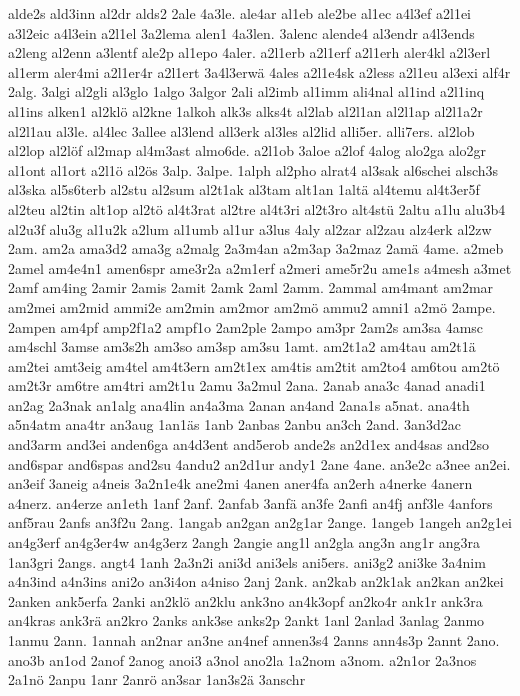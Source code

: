 {alde2s
ald3inn
al2dr
alds2
2ale
4a3le.
ale4ar
al1eb
ale2be
al1ec
a4l3ef
a2l1ei
a3l2eic
a4l3ein
a2l1el
3a2lema
alen1
4a3len.
3alenc
alende4
al3endr
a4l3ends
a2leng
al2enn
a3lentf
ale2p
al1epo
4aler.
a2l1erb
a2l1erf
a2l1erh
aler4kl
a2l3erl
al1erm
aler4mi
a2l1er4r
a2l1ert
3a4l3erwä
4ales
a2l1e4sk
a2less
a2l1eu
al3exi
alf4r
2alg.
3algi
al2gli
al3glo
1algo
3algor
2ali
al2imb
al1imm
ali4nal
al1ind
a2l1inq
al1ins
alken1
al2klö
al2kne
1alkoh
alk3s
alks4t
al2lab
al2l1an
al2l1ap
al2l1a2r
al2l1au
al3le.
al4lec
3allee
al3lend
all3erk
al3les
al2lid
alli5er.
alli7ers.
al2lob
al2lop
al2löf
al2map
al4m3ast
almo6de.
a2l1ob
3aloe
a2lof
4alog
alo2ga
alo2gr
al1ont
al1ort
a2l1ö
al2ös
3alp.
3alpe.
1alph
al2pho
alrat4
al3sak
al6schei
alsch3s
al3ska
al5s6terb
al2stu
al2sum
al2t1ak
al3tam
alt1an
1altä
al4temu
al4t3er5f
al2teu
al2tin
alt1op
al2tö
al4t3rat
al2tre
al4t3ri
al2t3ro
alt4stü
2altu
a1lu
alu3b4
al2u3f
alu3g
al1u2k
a2lum
al1umb
al1ur
a3lus
4aly
al2zar
al2zau
alz4erk
al2zw
2am.
am2a
ama3d2
ama3g
a2malg
2a3m4an
a2m3ap
3a2maz
2amä
4ame.
a2meb
2amel
am4e4n1
amen6spr
ame3r2a
a2m1erf
a2meri
ame5r2u
ame1s
a4mesh
a3met
2amf
am4ing
2amir
2amis
2amit
2amk
2aml
2amm.
2ammal
am4mant
am2mar
am2mei
am2mid
ammi2e
am2min
am2mor
am2mö
ammu2
amni1
a2mö
2ampe.
2ampen
am4pf
amp2f1a2
ampf1o
2am2ple
2ampo
am3pr
2am2s
am3sa
4amsc
am4schl
3amse
am3s2h
am3so
am3sp
am3su
1amt.
am2t1a2
am4tau
am2t1ä
am2tei
amt3eig
am4tel
am4t3ern
am2t1ex
am4tis
am2tit
am2to4
am6tou
am2tö
am2t3r
am6tre
am4tri
am2t1u
2amu
3a2mul
2ana.
2anab
ana3c
4anad
anadi1
an2ag
2a3nak
an1alg
ana4lin
an4a3ma
2anan
an4and
2ana1s
a5nat.
ana4th
a5n4atm
ana4tr
an3aug
1an1äs
1anb
2anbas
2anbu
an3ch
2and.
3an3d2ac
and3arm
and3ei
anden6ga
an4d3ent
and5erob
ande2s
an2d1ex
and4sas
and2so
and6spar
and6spas
and2su
4andu2
an2d1ur
andy1
2ane
4ane.
an3e2c
a3nee
an2ei.
an3eif
3aneig
a4neis
3a2n1e4k
ane2mi
4anen
aner4fa
an2erh
a4nerke
4anern
a4nerz.
an4erze
an1eth
1anf
2anf.
2anfab
3anfä
an3fe
2anfi
an4fj
anf3le
4anfors
anf5rau
2anfs
an3f2u
2ang.
1angab
an2gan
an2g1ar
2ange.
1angeb
1angeh
an2g1ei
an4g3erf
an4g3er4w
an4g3erz
2angh
2angie
ang1l
an2gla
ang3n
ang1r
ang3ra
1an3gri
2angs.
angt4
1anh
2a3n2i
ani3d
ani3els
ani5ers.
ani3g2
ani3ke
3a4nim
a4n3ind
a4n3ins
ani2o
an3i4on
a4niso
2anj
2ank.
an2kab
an2k1ak
an2kan
an2kei
2anken
ank5erfa
2anki
an2klö
an2klu
ank3no
an4k3opf
an2ko4r
ank1r
ank3ra
an4kras
ank3rä
an2kro
2anks
ank3se
anks2p
2ankt
1anl
2anlad
3anlag
2anmo
1anmu
2ann.
1annah
an2nar
an3ne
an4nef
annen3s4
2anns
ann4s3p
2annt
2ano.
ano3b
an1od
2anof
2anog
anoi3
a3nol
ano2la
1a2nom
a3nom.
a2n1or
2a3nos
2a1nö
2anpu
1anr
2anrö
an3sar
1an3s2ä
3anschr
}
